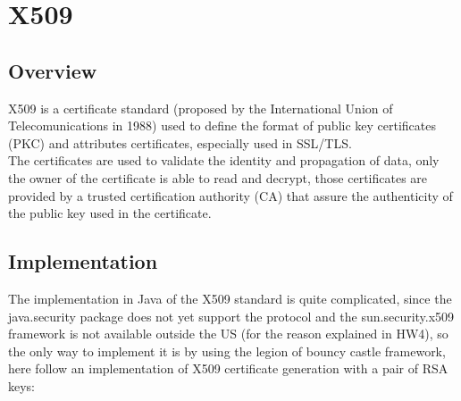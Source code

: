 \documentclass{article}
\begin{document}
\section{X509}

\subsection{Overview}
X509 is a certificate standard (proposed by the International Union of Telecomunications in 1988) used to define the format of public key certificates (PKC) and attributes certificates, especially used in SSL/TLS.\\
The certificates are used to validate the identity and propagation of data, only the owner of the certificate is able to read and decrypt, those certificates are provided by a trusted certification authority (CA) that assure the 
authenticity of the public key used in the certificate.

\subsection{Implementation}

The implementation in Java of the X509 standard is quite complicated, since the java.security package does not yet support the protocol and the sun.security.x509 framework is not available outside the US (for the reason explained in HW4), so the only way to implement it is by using the legion of bouncy castle framework, here follow an implementation of X509 certificate generation with a pair of RSA keys:
\end{document}
